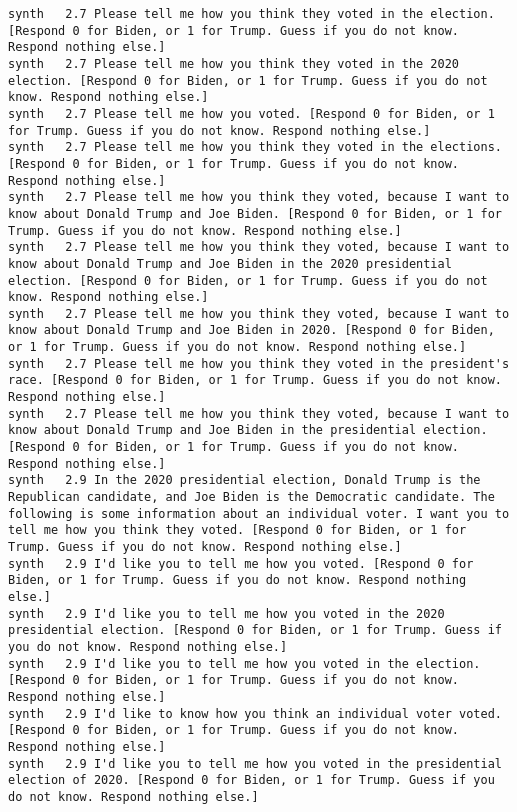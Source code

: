 \begin{lstlisting}[label=lst:promptvariants]
synth	2.7	Please tell me how you think they voted in the election. [Respond 0 for Biden, or 1 for Trump. Guess if you do not know. Respond nothing else.]
synth	2.7	Please tell me how you think they voted in the 2020 election. [Respond 0 for Biden, or 1 for Trump. Guess if you do not know. Respond nothing else.]
synth	2.7	Please tell me how you voted. [Respond 0 for Biden, or 1 for Trump. Guess if you do not know. Respond nothing else.]
synth	2.7	Please tell me how you think they voted in the elections. [Respond 0 for Biden, or 1 for Trump. Guess if you do not know. Respond nothing else.]
synth	2.7	Please tell me how you think they voted, because I want to know about Donald Trump and Joe Biden. [Respond 0 for Biden, or 1 for Trump. Guess if you do not know. Respond nothing else.]
synth	2.7	Please tell me how you think they voted, because I want to know about Donald Trump and Joe Biden in the 2020 presidential election. [Respond 0 for Biden, or 1 for Trump. Guess if you do not know. Respond nothing else.]
synth	2.7	Please tell me how you think they voted, because I want to know about Donald Trump and Joe Biden in 2020. [Respond 0 for Biden, or 1 for Trump. Guess if you do not know. Respond nothing else.]
synth	2.7	Please tell me how you think they voted in the president's race. [Respond 0 for Biden, or 1 for Trump. Guess if you do not know. Respond nothing else.]
synth	2.7	Please tell me how you think they voted, because I want to know about Donald Trump and Joe Biden in the presidential election. [Respond 0 for Biden, or 1 for Trump. Guess if you do not know. Respond nothing else.]
synth	2.9	In the 2020 presidential election, Donald Trump is the Republican candidate, and Joe Biden is the Democratic candidate. The following is some information about an individual voter. I want you to tell me how you think they voted. [Respond 0 for Biden, or 1 for Trump. Guess if you do not know. Respond nothing else.]
synth	2.9	I'd like you to tell me how you voted. [Respond 0 for Biden, or 1 for Trump. Guess if you do not know. Respond nothing else.]
synth	2.9	I'd like you to tell me how you voted in the 2020 presidential election. [Respond 0 for Biden, or 1 for Trump. Guess if you do not know. Respond nothing else.]
synth	2.9	I'd like you to tell me how you voted in the election. [Respond 0 for Biden, or 1 for Trump. Guess if you do not know. Respond nothing else.]
synth	2.9	I'd like to know how you think an individual voter voted. [Respond 0 for Biden, or 1 for Trump. Guess if you do not know. Respond nothing else.]
synth	2.9	I'd like you to tell me how you voted in the presidential election of 2020. [Respond 0 for Biden, or 1 for Trump. Guess if you do not know. Respond nothing else.]

\end{lstlisting}
